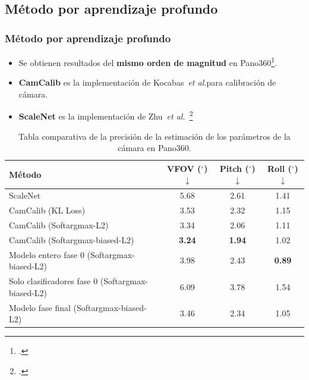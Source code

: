 \subsection{Método por aprendizaje profundo}
\begin{frame}
  \frametitle{Método por aprendizaje profundo}
\begin{itemize}
  \item Se obtienen resultados del \textbf{mismo orden de magnitud} en Pano360\footcite{SPEC}.
  \item \textbf{CamCalib} es la implementación de Kocabas~\emph{et al.}\footnotemark[\value{footnote}] para calibración de cámara.
  \item \textbf{ScaleNet} es la implementación de Zhu~\emph{et al.}~\footcite{SVMIW}
\end{itemize}
\begin{table}[!ht]
  \centering
  \scriptsize
  \begin{tabular}{|l|c|c|c|}
  \hline
  \rowcolor[HTML]{FFCB2F}
  \textbf{Método} & \textbf{VFOV ($^\circ$)$\downarrow$} & \textbf{Pitch ($^\circ$)$\downarrow$} & \textbf{Roll ($^\circ$)$\downarrow$} \\
  \hline
  ScaleNet\footnotemark[\value{footnote}] & 5.68 & 2.61 & 1.41 \\
  \hline
  CamCalib (KL Loss)\footnotemark[\number\numexpr\value{footnote}-1\relax] & 3.53 & 2.32 & 1.15 \\
  \hline
  CamCalib (Softargmax-L2)\footnotemark[\number\numexpr\value{footnote}-1\relax] & 3.34 & 2.06 & 1.11 \\
  \hline
  CamCalib (Softargmax-biased-L2)\footnotemark[\number\numexpr\value{footnote}-1\relax] & \textbf{3.24} & \textbf{1.94} & 1.02 \\
  \hline
  \rowcolor{gray!25}
  Modelo entero fase 0 (Softargmax-biased-L2) & 3.98 & 2.43 & \textbf{0.89} \\
  \hline
  \rowcolor{gray!25}
  Solo clasificadores fase 0 (Softargmax-biased-L2) & 6.09 & 3.78 & 1.54 \\
  \hline
  \rowcolor{gray!25}
  Modelo fase final (Softargmax-biased-L2) & 3.46 & 2.34 & 1.05 \\
  \hline
  \end{tabular}
  \caption
  {
    Tabla comparativa de la precisión de la estimación de los parámetros de la cámara en Pano360\footnotemark[\number\numexpr\value{footnote}-1\relax].
}
\end{table}
\end{frame}


